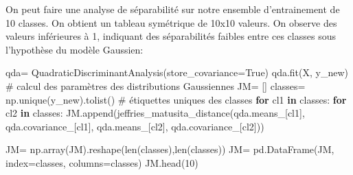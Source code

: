 \documentclass[
  french,
  11pt,
  letterpaper,
  open=any,
  twoside=false,
  french]{scrbook}
\newenvironment{Shaded}{\begin{snugshade}}{\end{snugshade}}
\newcommand{\BuiltInTok}[1]{\textcolor[rgb]{0.00,0.23,0.31}{#1}}
\newcommand{\CommentTok}[1]{\textcolor[rgb]{0.37,0.37,0.37}{#1}}
\newcommand{\ControlFlowTok}[1]{\textcolor[rgb]{0.00,0.23,0.31}{\textbf{#1}}}
\newcommand{\DecValTok}[1]{\textcolor[rgb]{0.68,0.00,0.00}{#1}}
\newcommand{\KeywordTok}[1]{\textcolor[rgb]{0.00,0.23,0.31}{\textbf{#1}}}
\newcommand{\NormalTok}[1]{\textcolor[rgb]{0.00,0.23,0.31}{#1}}
\newcommand{\OperatorTok}[1]{\textcolor[rgb]{0.37,0.37,0.37}{#1}}
\newcommand{\VariableTok}[1]{\textcolor[rgb]{0.07,0.07,0.07}{#1}}
\begin{document}
On peut faire une analyse de séparabilité sur notre ensemble
d'entrainement de 10 classes. On obtient un tableau symétrique de 10x10
valeurs. On observe des valeurs inférieures à 1, indiquant des
séparabilités faibles entre ces classes sous l'hypothèse du modèle
Gaussien:

\begin{Shaded}
\begin{Highlighting}[]
\NormalTok{qda}\OperatorTok{=}\NormalTok{ QuadraticDiscriminantAnalysis(store\_covariance}\OperatorTok{=}\VariableTok{True}\NormalTok{)}
\NormalTok{qda.fit(X, y\_new) }\CommentTok{\# calcul des paramètres des distributions Gaussiennes}
\NormalTok{JM}\OperatorTok{=}\NormalTok{ []}
\NormalTok{classes}\OperatorTok{=}\NormalTok{ np.unique(y\_new).tolist() }\CommentTok{\# étiquettes uniques des classes}
\ControlFlowTok{for}\NormalTok{ cl1 }\KeywordTok{in}\NormalTok{ classes:}
  \ControlFlowTok{for}\NormalTok{ cl2 }\KeywordTok{in}\NormalTok{ classes:}
\NormalTok{    JM.append(jeffries\_matusita\_distance(qda.means\_[cl1], qda.covariance\_[cl1], qda.means\_[cl2], qda.covariance\_[cl2]))}

\NormalTok{JM}\OperatorTok{=}\NormalTok{ np.array(JM).reshape(}\BuiltInTok{len}\NormalTok{(classes),}\BuiltInTok{len}\NormalTok{(classes))}
\NormalTok{JM}\OperatorTok{=}\NormalTok{ pd.DataFrame(JM, index}\OperatorTok{=}\NormalTok{classes, columns}\OperatorTok{=}\NormalTok{classes)}
\NormalTok{JM.head(}\DecValTok{10}\NormalTok{)}
\end{Highlighting}
\end{Shaded}
\end{document}
